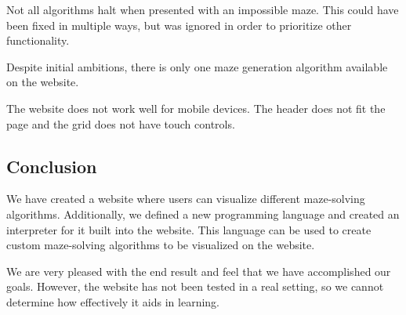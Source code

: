 Not all algorithms halt when presented with an impossible maze. This could have been fixed in multiple ways, but was ignored in order to prioritize other functionality.

Despite initial ambitions, there is only one maze generation algorithm available on the website.

The website does not work well for mobile devices. The header does not fit the page and the grid does not have touch controls.

\subsection{Conclusion}

We have created a website where users can visualize different maze-solving algorithms. Additionally, we defined a new programming language and created an interpreter for it built into the website. This language can be used to create custom maze-solving algorithms to be visualized on the website.

We are very pleased with the end result and feel that we have accomplished our goals. However, the website has not been tested in a real setting, so we cannot determine how effectively it aids in learning.
